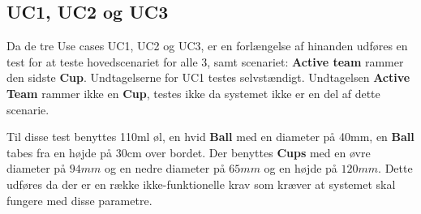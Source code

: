 \documentclass[Accepttestspecifikation/Accepttest_Main.tex]{subfiles}
\begin{document}
\subsection{UC1, UC2 og UC3} \label{sec:UC1}

Da de tre Use cases UC1, UC2 og UC3, er en forlængelse af hinanden udføres en test for at teste hovedscenariet for alle 3, samt scenariet: \textbf{Active team} rammer den sidste \textbf{Cup}. Undtagelserne for UC1 testes selvstændigt. Undtagelsen \textbf{Active Team} rammer ikke en \textbf{Cup}, testes ikke da systemet ikke er en del af dette scenarie. 

Til disse test benyttes 110ml øl, en hvid \textbf{Ball} med en diameter på 40mm, en \textbf{Ball} tabes fra en højde på 30cm over bordet. Der benyttes \textbf{Cups} med en øvre diameter på $94\si{mm}$ og en nedre diameter på $65\si{mm}$ og en højde på $120mm$. Dette udføres da der er en række ikke-funktionelle krav som kræver at systemet skal fungere med disse parametre.
\end{document}
